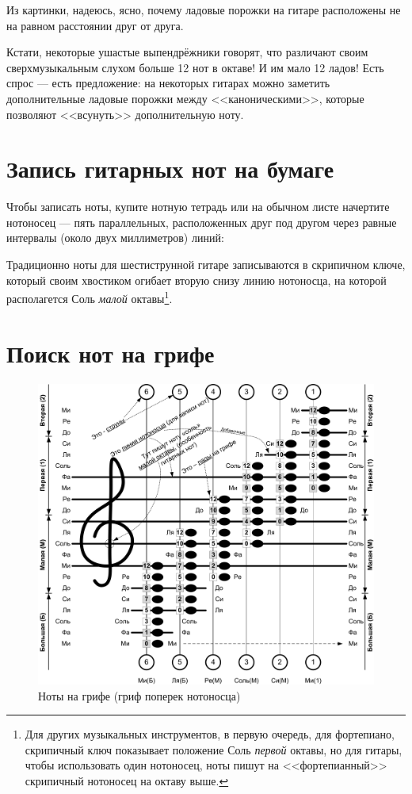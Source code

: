 Из картинки, надеюсь, ясно, почему ладовые порожки на гитаре расположены не на равном расстоянии друг от друга.

Кстати, некоторые ушастые выпендрёжники говорят, что различают своим сверхмузыкальным слухом больше 12 нот в октаве! И им мало 12 ладов! Есть спрос --- есть предложение: на некоторых гитарах можно заметить дополнительные ладовые порожки между <<каноническими>>, которые позволяют <<всунуть>> дополнительную ноту.


\section{Запись гитарных нот на бумаге}

Чтобы записать ноты, купите нотную тетрадь или на обычном листе начертите нотоносец --- пять параллельных, расположенных друг под другом через равные интервалы (около двух миллиметров) линий:
 

Традиционно ноты для шестиструнной гитаре записываются в скрипичном ключе, который своим хвостиком огибает вторую снизу линию нотоносца, на которой располагется Соль \emph{малой} октавы\footnote{Для других музыкальных инструментов, в первую очередь, для фортепиано, скрипичный ключ показывает положение Соль \emph{первой} октавы, но для гитары, чтобы использовать один нотоносец, ноты пишут на <<фортепианный>> скрипичный нотоносец на октаву выше.}.


\section{Поиск нот на грифе}

\begin{figure}[!ht]
    \centering
    \includegraphics[width=\textwidth]{fig/lad-by-notes} 
    \caption{Ноты на грифе (гриф поперек нотоносца)}\label{fig:ladByNotes}
\end{figure} 

